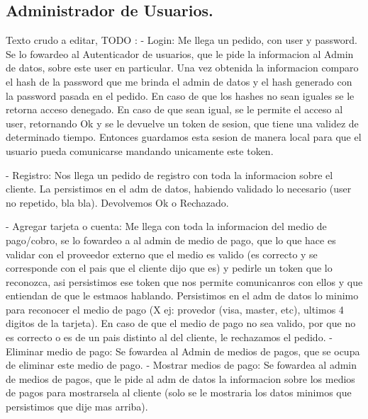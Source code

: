 \subsection{Administrador de Usuarios.}

%


Texto crudo a editar, TODO :
- Login: Me llega un pedido, con user y password. Se lo fowardeo al Autenticador de usuarios, que le pide la informacion al Admin de datos, sobre este user en particular. Una vez obtenida la informacion comparo el hash de la password que me brinda el admin de datos y el hash generado con la password pasada en el pedido. En caso de que los hashes no sean iguales se le retorna acceso denegado. En caso de que sean igual, se le permite el acceso al user, retornando Ok y se le devuelve un token de sesion, que tiene una validez de determinado tiempo.
Entonces guardamos esta sesion de manera local para que el usuario pueda comunicarse mandando unicamente este token.

- Registro: Nos llega un pedido de registro con toda la informacion sobre el cliente. La persistimos en el adm de datos, habiendo validado lo necesario (user no repetido, bla bla). Devolvemos Ok o Rechazado.

- Agregar tarjeta o cuenta: Me llega con toda la informacion del medio de pago/cobro, se lo fowardeo a al admin de medio de pago, que lo que hace es validar con el proveedor externo que el medio es valido (es correcto y se corresponde con el pais que el cliente dijo que es) y pedirle un token que lo reconozca, asi persistimos ese token que nos permite comunicanros con ellos y que entiendan de que le estmaos hablando. Persistimos en el adm de datos lo minimo para reconocer el medio de pago (X ej: provedor (visa, master, etc), ultimos 4 digitos de la tarjeta). En caso de que el medio de pago no sea valido, por que no es correcto o es de un pais distinto al del cliente, le rechazamos el pedido.
- Eliminar medio de pago: Se fowardea al Admin de medios de pagos, que se ocupa de eliminar este medio de pago.
- Mostrar medios de pago: Se fowardea al admin de medios de pagos, que le pide al adm de datos la informacion sobre los medios de pagos para mostrarsela al cliente (solo se le mostraria los datos minimos que persistimos que dije mas arriba).

